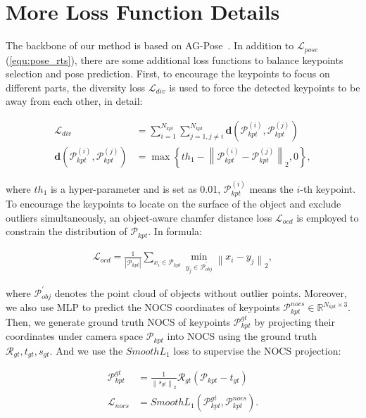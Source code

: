 \section{More Loss Function Details}
\label{sec:suppl_loss_details}
The backbone of our method is based on AG-Pose~\cite{lin2024instance}. In addition to $\mathcal{L}_{pose}$ (\cref{equ:pose_rts}), there are some additional loss functions to balance keypoints selection and pose prediction. First, to encourage the keypoints to focus on different parts, the diversity loss $\mathcal{L}_{div}$ is used to force the detected keypoints to be away from each other, in detail:
\begin{small} 
\begin{align}
    \mathcal{L}_{div}&=\sum_{i=1}^{N_{kpt}} \sum_{j=1, j \neq i}^{N_{kpt}} \mathbf{d}\left(\mathcal{P}_{kpt}^{(i)}, \mathcal{P}_{kpt}^{(j)}\right) \label{equ:supp_divloss1}\\
    \mathbf{d}\left(\mathcal{P}_{kpt}^{(i)}, \mathcal{P}_{kpt}^{(j)}\right)&=\max \left\{th_{1}-\left\|\mathcal{P}_{kpt}^{(i)}-\mathcal{P}_{kpt}^{(j)}\right\|_{2}, 0\right\} \label{equ:supp_divloss2},
\end{align}
\end{small}
where $th_1$ is a hyper-parameter and is set as 0.01, $\mathcal{P}_{kpt}^{(i)}$ means the $i$-th keypoint.
To encourage the keypoints to locate on the surface of the object and exclude outliers simultaneously, an object-aware chamfer distance loss $\mathcal{L}_{ocd}$ is employed to constrain the distribution of $\mathcal{P}_{kpt}$. In formula:
\begin{small} 
\begin{align}
    \mathcal{L}_{ocd}=\frac{1}{\left|\mathcal{P}_{kpt}\right|} \sum_{x_{i} \in \mathcal{P}_{kpt}} \min _{y_{j} \in \mathcal{P}_{obj}^{'}}\left\|x_{i}-y_{j}\right\|_{2}, \label{equ:supp_ocdloss}
\end{align}
\end{small}
where $\mathcal{P}_{obj}^{'}$ denotes the point cloud of objects without outlier points.
Moreover, we also use MLP to predict the NOCS coordinates of keypoints $\mathcal{P}_{kpt}^{nocs} \in \mathbb{R}^{N_{kpt} \times 3}$. Then, we generate ground truth NOCS of keypoints $\mathcal{P}_{kpt}^{gt}$ by projecting their coordinates under camera space $\mathcal{P}_{kpt}$ into NOCS using the ground truth $\mathcal{R}_{gt},t_{gt},s_{gt}$. And we use the $SmoothL_1$ loss to supervise the NOCS projection:
\begin{small} 
\begin{align}
    \mathcal{P}_{kpt}^{gt}&=\frac{1}{\left\|s_{gt}\right\|_{2}} \mathcal{R}_{gt}\left(\mathcal{P}_{kpt}-t_{gt}\right) \label{equ:supp_nocsgt}\\
    \mathcal{L}_{nocs} &= SmoothL_{1}(\mathcal{P}_{kpt}^{gt},\mathcal{P}_{kpt}^{nocs}). \label{equ:supp_nocsloss}
\end{align}
\end{small}
